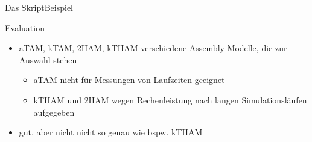 \documentclass{beamer}
\begin{document}
\begin{frame}[c]{Das Skript}{Beispiel}
\begin{minipage}{\textwidth}
    \end{minipage}
\end{frame}

\begin{frame}[t]{Evaluation}
    \begin{itemize}
        \item aTAM, kTAM, 2HAM, kTHAM verschiedene Assembly-Modelle, die zur Auswahl stehen
        \begin{itemize}
            \item aTAM nicht für Messungen von Laufzeiten geeignet
            \item kTHAM und 2HAM wegen Rechenleistung nach langen Simulationsläufen aufgegeben 
        \end{itemize}
        \item \textbf{\color{uzl_oceangreen}{kTAM}} gut, aber nicht nicht so genau wie bspw. kTHAM
    \end{itemize}
\end{frame}
\end{document}
